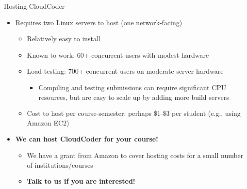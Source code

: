 \documentclass{beamer}
\begin{document}
%
%
%
%
%
%

\begin{frame}{Hosting CloudCoder}

\begin{itemize}
  \item Requires two Linux servers to host (one network-facing)
    \begin{itemize}
    \item Relatively easy to install
    \item Known to work: 60+ concurrent users with modest hardware
    \item Load testing: 700+ concurrent users
          on moderate server hardware
      \begin{itemize}
      \item Compiling and testing submissions can require significant
            CPU resources, but are easy to scale up by adding more
            build servers
      \end{itemize}
    \item Cost to host per course-semester: perhaps \$1-\$3 per student
          (e.g., using Amazon EC2)
    \end{itemize}
  \item {\bf We can host CloudCoder for your course!}
    \begin{itemize}
    \item We have a grant from Amazon to cover hosting costs for
          a small number of institutions/courses
    \item {\bf Talk to us if you are interested!}
    \end{itemize}
\end{itemize}

\end{frame}
\end{document}
